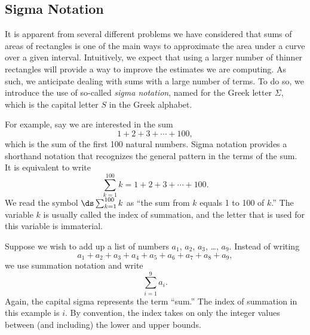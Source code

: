 %
%
%



\subsection*{Sigma Notation}

It is apparent from several different problems we have considered that sums of areas of rectangles is one of the main ways to approximate the area under a curve over a given interval.  Intuitively, we expect that using a larger number of thinner rectangles will provide a way to improve the estimates we are computing.  As such, we anticipate dealing with sums with a large number of terms.  To do so, we introduce the use of so-called \emph{sigma notation}, named for the Greek letter $\Sigma$, which is the capital letter $S$ in the Greek alphabet.

For example, say we are interested in the sum
$$1 + 2 + 3 + \cdots + 100,$$
which is the sum of the first 100 natural numbers.  Sigma notation provides a shorthand notation that recognizes the general pattern in the terms of the sum.  It is equivalent to write
$$\sum_{k=1}^{100} k =  1 + 2 + 3 + \cdots + 100.$$
We read the symbol $\ds \sum_{k=1}^{100} k$ as ``the sum from $k$ equals 1 to 100 of $k$.''  The variable $k$ is usually called the index of summation, and the letter that is used for this variable is immaterial. 

Suppose we wish to add up a list of numbers $a_1$, $a_2$, $a_3$, \ldots, $a_9$. Instead of writing \[ a_1+a_2+a_3+a_4+a_5+a_6+a_7+a_8+a_9, \]
we use summation notation and write 
\[ \sum_{i=1}^9 a_i. \]
Again, the capital sigma represents the term ``sum.'' The index of summation in this example is $i$. By convention, the index takes on only the integer values between (and including) the lower and upper bounds. 

